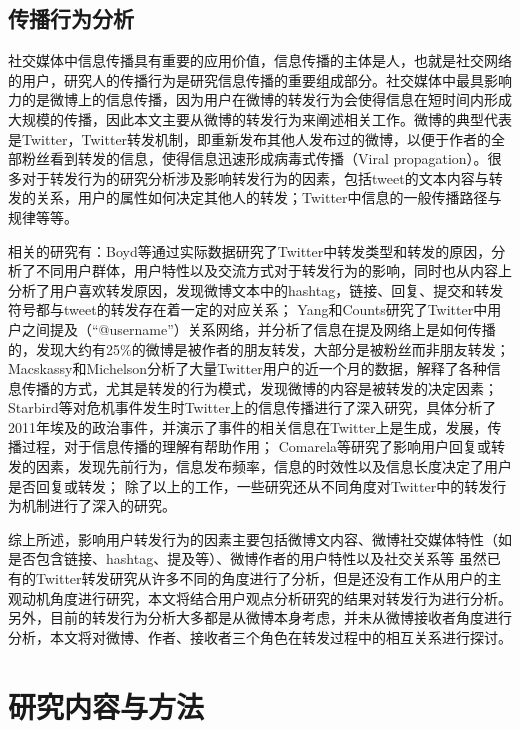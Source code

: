 \subsection{传播行为分析}
\label{rel3}
社交媒体中信息传播具有重要的应用价值，信息传播的主体是人，也就是社交网络的用户，研究人的传播行为是研究信息传播的重要组成部分。社交媒体中最具影响力的是微博上的信息传播，因为用户在微博的转发行为会使得信息在短时间内形成大规模的传播，因此本文主要从微博的转发行为来阐述相关工作。微博的典型代表是Twitter，Twitter转发机制，即重新发布其他人发布过的微博，以便于作者的全部粉丝看到转发的信息，使得信息迅速形成病毒式传播（Viral propagation）。很多对于转发行为的研究分析涉及影响转发行为的因素，包括tweet的文本内容与转发的关系，用户的属性如何决定其他人的转发；Twitter中信息的一般传播路径与规律等等。

相关的研究有：Boyd等通过实际数据研究了Twitter中转发类型和转发的原因，分析了不同用户群体，用户特性以及交流方式对于转发行为的影响，同时也从内容上分析了用户喜欢转发原因，发现微博文本中的hashtag，链接、回复、提交和转发符号都与tweet的转发存在着一定的对应关系；
Yang和Counts研究了Twitter中用户之间提及（“@username”）关系网络，并分析了信息在提及网络上是如何传播的，发现大约有25\%的微博是被作者的朋友转发，大部分是被粉丝而非朋友转发；
Macskassy和Michelson分析了大量Twitter用户的近一个月的数据，解释了各种信息传播的方式，尤其是转发的行为模式，发现微博的内容是被转发的决定因素；
Starbird等对危机事件发生时Twitter上的信息传播进行了深入研究，具体分析了2011年埃及的政治事件，并演示了事件的相关信息在Twitter上是生成，发展，传播过程，对于信息传播的理解有帮助作用；
Comarela等研究了影响用户回复或转发的因素，发现先前行为，信息发布频率，信息的时效性以及信息长度决定了用户是否回复或转发；
除了以上的工作，一些研究还从不同角度对Twitter中的转发行为机制进行了深入的研究。

综上所述，影响用户转发行为的因素主要包括微博文内容、微博社交媒体特性（如是否包含链接、hashtag、提及等）、微博作者的用户特性以及社交关系等
虽然已有的Twitter转发研究从许多不同的角度进行了分析，但是还没有工作从用户的主观动机角度进行研究，本文将结合用户观点分析研究的结果对转发行为进行分析。另外，目前的转发行为分析大多都是从微博本身考虑，并未从微博接收者角度进行分析，本文将对微博、作者、接收者三个角色在转发过程中的相互关系进行探讨。

\section{研究内容与方法}


